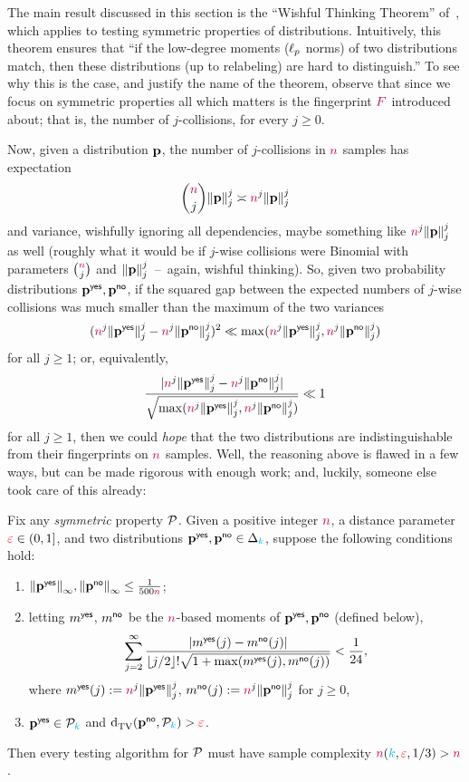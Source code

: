 The main result discussed in this section is the ``Wishful Thinking Theorem'' of~\citet{Valiant:11}, which applies to testing symmetric properties of distributions. Intuitively, this theorem ensures that ``if the low-degree moments ($\lp[p]$ norms) of two distributions match, then these distributions (up to relabeling) are hard to distinguish.'' To see why this is the case, and justify the name of the theorem, observe that since we focus on symmetric properties all which matters is the fingerprint $\freq$ introduced about; that is, the number of $j$-collisions, for every $j\geq 0$.

Now, given a distribution $\p$, the number of $j$-collisions in $\ns$ samples has expectation 
\[
	\binom{\ns}{j}\norm{\p}_j^j \asymp \ns^j\norm{\p}_j^j
\]
and variance, wishfully ignoring all dependencies, maybe something like $\ns^j\norm{\p}_j^j$ as well (roughly what it would be if $j$-wise collisions were Binomial with parameters $\binom{\ns}{j}$ and $\norm{\p}_j^j$~--~again, wishful thinking). So, given two probability distributions $\p^\yes,\p^\no$, if the squared gap between the expected numbers of $j$-wise collisions was much smaller than the maximum of the two variances
\[
		(\ns^j\norm{\p^\yes}_j^j - \ns^j\norm{\p^\no}_j^j )^2 \ll
		\max(\ns^j\norm{\p^\yes}_j^j, \ns^j\norm{\p^\no}_j^j)
\]
for all $j\geq 1$; or, equivalently, 
\[
	\frac{|\ns^j\norm{\p^\yes}_j^j - \ns^j\norm{\p^\no}_j^j|}{\sqrt{\max(\ns^j\norm{\p^\yes}_j^j, \ns^j\norm{\p^\no}_j^j)}} \ll 1
\] 
for all $j\geq 1$, then we could \emph{hope} that the two distributions are indistinguishable from their fingerprints on $\ns$ samples. Well, the reasoning above is flawed in a few ways, but can be made rigorous with enough work; and, luckily, someone else took care of this already:
\begin{theorem}\label{theo:valiant:wishful}
  Fix any \emph{symmetric} property $\property$. Given a positive integer $\ns$, a distance parameter $\dst\in(0,1]$, and two distributions $\p^\yes,\p^\no\in\distribs{\ab}$, suppose the following conditions hold:
  \begin{enumerate}
    \item $\norminf{\p^\yes},\norminf{\p^\no} \leq \frac{1}{500\ns}$;
    \item letting $m^\yes$, $m^\no$ be the $\ns$-based moments of $\p^\yes,\p^\no$ (defined below),
      \[
         \sum_{j=2}^\infty \frac{\abs{m^{\yes}(j)-m^{\no}(j)}}{\flr{j/2}!\sqrt{1+\max(m^{\yes}(j),m^{\no}(j))}} < \frac{1}{24},
      \]
      where $m^{\yes}(j) \eqdef \ns^j\norm{\p^\yes}_j^j$, $m^{\no}(j) \eqdef \ns^j\norm{\p^\no}_j^j$ for $j\geq 0$,
     \item $\p^\yes\in\property_\ab$ and $\totalvardist{\p^\no}{\property_\ab}>\dst$.
  \end{enumerate}
  Then every testing algorithm for $\property$ must have sample complexity $\ns(\ab,\dst, 1/3) > \ns$.
\end{theorem}
